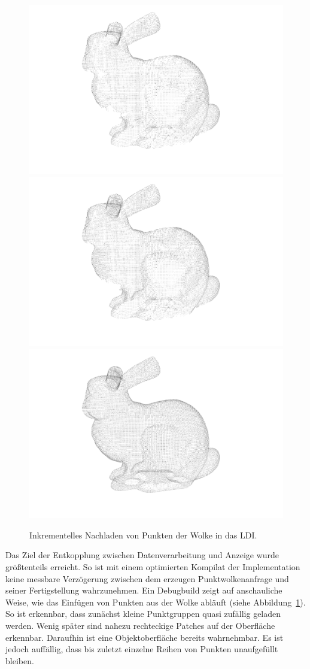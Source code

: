 \documentclass[hyperref, beleg, german]{cgvpub}
\begin{document}
\begin{figure}
	\includegraphics[width = .48\linewidth]{images/incrementalLoading/107}
	\includegraphics[width = .48\linewidth]{images/incrementalLoading/109}%
	\includegraphics[width = .48\linewidth]{images/incrementalLoading/115}
	\caption{Inkrementelles Nachladen von Punkten der Wolke in das LDI.}%
	\label{img:incload}
\end{figure}

Das Ziel der Entkopplung zwischen Datenverarbeitung und Anzeige wurde
größtenteils erreicht. So ist mit einem optimierten Kompilat der Implementation
keine messbare Verzögerung zwischen dem erzeugen Punktwolkenanfrage und seiner
Fertigstellung wahrzunehmen. Ein Debugbuild zeigt auf anschauliche Weise, wie
das Einfügen von Punkten aus der Wolke abläuft (siehe
Abbildung~\ref{img:incload}). So ist erkennbar, dass zunächst kleine
Punktgruppen quasi zufällig geladen werden. Wenig später sind nahezu
rechteckige Patches auf der Oberfläche erkennbar. Daraufhin ist eine
Objektoberfläche bereits wahrnehmbar. Es ist jedoch auffällig, dass bis zuletzt
einzelne Reihen von Punkten unaufgefüllt bleiben.
\end{document}
